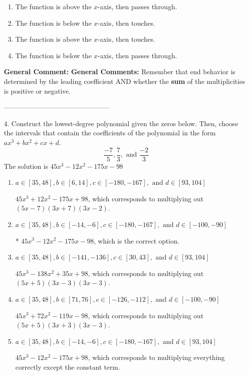 \documentclass{extbook}[14pt]
\begin{document}
\begin{enumerate}[label=\Alph*.] 
\item The function is above the $x$-axis, then passes through.  
\item The function is below the $x$-axis, then touches.  
\item The function is above the $x$-axis, then touches.  
\item The function is below the $x$-axis, then passes through.  
\end{enumerate} 
 
\textbf{General Comment:} \textbf{General Comments:} Remember that end behavior is determined by the leading coefficient AND whether the \textbf{sum} of the multiplicities is positive or negative. 

-----------------------------------------------

4. Construct the lowest-degree polynomial given the zeros below. Then, choose the intervals that contain the coefficients of the polynomial in the form $ax^3+bx^2+cx+d$.
\[ \frac{-7}{5}, \frac{7}{3}, \text{ and } \frac{-2}{3} \] 
The solution is $ 45x^{3} -12 x^{2} -175 x -98 $ 

\begin{enumerate}[label=\Alph*.] 
\item $ a \in [35, 48], b \in [6, 14], c \in [-180, -167], \text{ and } d \in [93, 104] $ 

 $45x^{3} +12 x^{2} -175 x + 98$, which corresponds to multiplying out $(5x -7)(3x + 7)(3x -2)$. 
\item $ a \in [35, 48], b \in [-14, -6], c \in [-180, -167], \text{ and } d \in [-100, -90] $ 

 * $45x^{3} -12 x^{2} -175 x -98$, which is the correct option. 
\item $ a \in [35, 48], b \in [-141, -136], c \in [30, 43], \text{ and } d \in [93, 104] $ 

 $45x^{3} -138 x^{2} +35 x + 98$, which corresponds to multiplying out $(5x + 5)(3x -3)(3x -3)$. 
\item $ a \in [35, 48], b \in [71, 76], c \in [-126, -112], \text{ and } d \in [-100, -90] $ 

 $45x^{3} +72 x^{2} -119 x -98$, which corresponds to multiplying out $(5x + 5)(3x + 3)(3x -3)$. 
\item $ a \in [35, 48], b \in [-14, -6], c \in [-180, -167], \text{ and } d \in [93, 104] $ 

 $45x^{3} -12 x^{2} -175 x + 98$, which corresponds to multiplying everything correctly except the constant term. 
\end{enumerate} 
 
\end{document}
